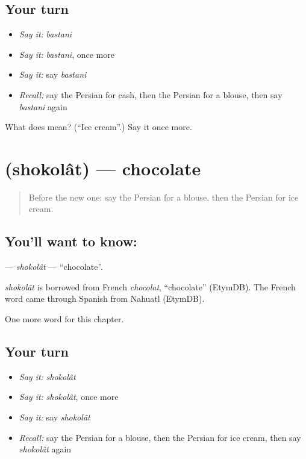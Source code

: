 \subsection*{Your turn}
\begin{itemize}
\raggedright
  \item \emph{Say it:} \emph{bastani}
  \item \emph{Say it:} \emph{bastani}, once more
  \item \emph{Say it:} say \emph{bastani}
  \item \emph{Recall:} say the Persian for cash, then the Persian for a blouse, then say \emph{bastani} again
\end{itemize}

\begin{tcolorbox}[breakable,colback=teal!4,colframe=teal!35!black,title={Before you move on}]
What does  mean? (\textquotedblleft{}Ice cream\textquotedblright{}.) Say it once more.
\end{tcolorbox}
\section[\texorpdfstring{\fa{شکلات} (shokolât)}{شکلات (shokolât)}]{ (shokolât) — chocolate}

\label{lesson:FA-C167-shokolat}



\begin{quote}
Before the new one: say the Persian for a blouse, then the Persian for ice cream.
\end{quote}

\subsection*{You'll want to know: }
\textbf{} — \emph{shokolât} — \textquotedblleft{}chocolate\textquotedblright{}.

\begin{cousinweb}
\emph{shokolât} is borrowed from French \emph{chocolat}, \textquotedblleft{}chocolate\textquotedblright{} (EtymDB). The French word came through Spanish from Nahuatl (EtymDB).
\end{cousinweb}

\begin{grammarlens}[title={What you've built}]
One more word for this chapter.
\end{grammarlens}

\subsection*{Your turn}
\begin{itemize}
\raggedright
  \item \emph{Say it:} \emph{shokolât}
  \item \emph{Say it:} \emph{shokolât}, once more
  \item \emph{Say it:} say \emph{shokolât}
  \item \emph{Recall:} say the Persian for a blouse, then the Persian for ice cream, then say \emph{shokolât} again
\end{itemize}

